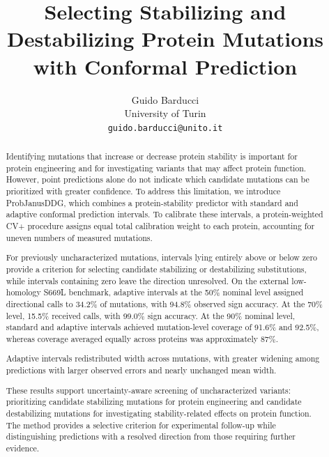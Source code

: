 \documentclass[11pt]{article}
\title{Selecting Stabilizing and Destabilizing Protein Mutations with Conformal Prediction}
\author{Guido Barducci\\
\small University of Turin\\
\small \texttt{guido.barducci@unito.it}}
\date{}
\begin{document}
\maketitle

\begin{abstract}
Identifying mutations that increase or decrease protein stability is important for protein engineering and for investigating variants that may affect protein function. However, point predictions alone do not indicate which candidate mutations can be prioritized with greater confidence. To address this limitation,  we introduce ProbJanusDDG, which combines a protein-stability predictor with standard and adaptive conformal prediction intervals.
To calibrate these intervals, a protein-weighted CV+ procedure assigns equal total calibration weight to each protein, accounting for uneven numbers of measured mutations.

For previously uncharacterized mutations, intervals lying entirely above or below zero provide a criterion for selecting candidate stabilizing or destabilizing substitutions, while intervals containing zero leave the direction unresolved. On the external low-homology S669L benchmark, adaptive intervals at the 50\% nominal level assigned directional calls to 34.2\% of mutations, with 94.8\% observed sign accuracy. At the 70\% level, 15.5\% received calls, with 99.0\% sign accuracy.
At the 90\% nominal level, standard and adaptive intervals achieved mutation-level coverage of 91.6\% and 92.5\%, whereas coverage averaged equally across proteins was approximately 87\%. 

Adaptive intervals redistributed width across mutations, with greater widening among predictions with larger observed errors and nearly unchanged mean width.

These results support uncertainty-aware screening of uncharacterized variants: prioritizing candidate stabilizing mutations for protein engineering and candidate destabilizing mutations for investigating stability-related effects on protein function. The method provides a selective criterion for experimental follow-up while distinguishing predictions with a resolved direction from those requiring further evidence.





\end{abstract}
\end{document}
